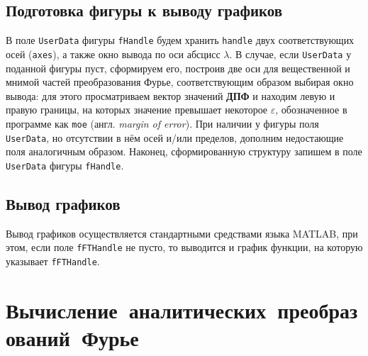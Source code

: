 \documentclass[11pt, oneside, draft]{article}
\numberwithin{equation}{section}
\begin{document}
    \subsection{Подготовка фигуры к выводу графиков} %
    \label{sub:prepare_graphs}
    В поле \texttt{UserData} фигуры \texttt{fHandle} будем хранить \texttt{handle} двух соответствующих осей (\texttt{axes}),
    а также окно вывода по оси абсцисс \(\lambda\). В случае, если \texttt{UserData} у поданной фигуры пуст, сформируем его, построив две оси для вещественной и мнимой частей
    преобразования Фурье, соответствующим образом выбирая окно вывода: для этого просматриваем вектор значений \textbf{ДПФ} и находим левую и правую границы, на которых значение
    превышает некоторое \(\varepsilon\), обозначенное в программе как \texttt{moe} (англ. \emph{margin of error}). 
    При наличии у фигуры поля \texttt{UserData}, но отсутствии в нём осей и/или пределов, дополним недостающие поля аналогичным образом.
    Наконец, сформированную структуру запишем в поле \texttt{UserData} фигуры \texttt{fHandle}.
    \subsection{Вывод графиков} %
    \label{sub:plotting}
    Вывод графиков осуществляется стандартными средствами языка MATLAB, при этом, если поле \texttt{fFTHandle} не пусто, то выводится и график функции, на которую
    указывает \texttt{fFTHandle}.
    \clearpage
    \section{Вычисление~аналитических~преобразований~Фурье}
\end{document}
